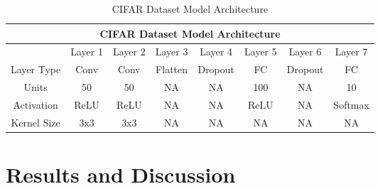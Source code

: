 \begin{table}[h]
\caption{CIFAR Dataset Model Architecture} \label{tab:CIFARArchitecture}
\begin{tabular}{|c||c|c|c|c|c|c|c|}
\hline
\multicolumn{8}{|c|}{CIFAR Dataset Model Architecture} \\
\hline
 & Layer 1 & Layer 2 & Layer 3& Layer 4 &Layer 5 & Layer 6 & Layer 7 \\
\hline
\hline
Layer Type & Conv & Conv & Flatten & Dropout & FC & Dropout  & FC \\
\hline
Units & 50 & 50 & NA & NA & 100 & NA & 10 \\
\hline
Activation & ReLU &ReLU & NA & NA & ReLU & NA & Softmax \\
\hline
Kernel Size & 3x3 &3x3 & NA &NA &NA &NA &NA  \\
\hline
\end{tabular}
\end{table}


\section{Results and Discussion}